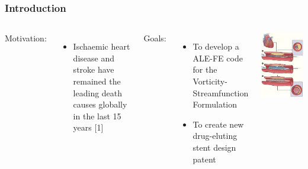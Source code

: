 \begin{frame}
\frametitle{Introduction}
\vspace{-0.9cm}
\begin{columns}[c]
Motivation:
\begin{itemize}
  \justifying
  \item Ischaemic heart disease and stroke have remained the leading death causes globally in the last 15 years [1]
\end{itemize}
 
\vspace{0.3cm}
 
Goals:
\begin{itemize}
 \justifying
 \item To develop a ALE-FE code for the Vorticity-Streamfunction Formulation 


 \vspace{0.2cm}
 \item To create new drug-eluting stent design patent 

\end{itemize}
\begin{center}
  \includegraphics[scale=0.38]{images/stent_bare.jpg}
\end{center}
\end{columns}


\end{frame}

